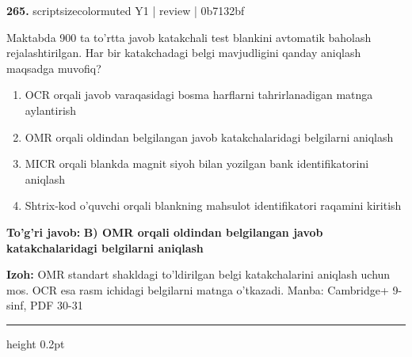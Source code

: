 \documentclass[10pt,a4paper]{article}
\begin{document}
{\bfseries\sffamily\color{ink} 265.} {scriptsizecolor{muted} Y1 | review | 0b7132bf}
\par
Maktabda 900 ta to'rtta javob katakchali test blankini avtomatik baholash rejalashtirilgan. Har bir katakchadagi belgi mavjudligini qanday aniqlash maqsadga muvofiq?
\begin{enumerate}[label=\Alph*),leftmargin=9mm]
\item OCR orqali javob varaqasidagi bosma harflarni tahrirlanadigan matnga aylantirish
\item OMR orqali oldindan belgilangan javob katakchalaridagi belgilarni aniqlash
\item MICR orqali blankda magnit siyoh bilan yozilgan bank identifikatorini aniqlash
\item Shtrix-kod o'quvchi orqali blankning mahsulot identifikatori raqamini kiritish
\end{enumerate}
\begin{tcolorbox}[enhanced,breakable,colback=teal!4,colframe=teal!60!black,boxrule=0.45pt,arc=1.2mm,left=2.7mm,right=2.7mm,top=1.8mm,bottom=1.8mm,before skip=2mm,after skip=2mm]
{\bfseries\sffamily\color{teal}To'g'ri javob:} \textbf{B) OMR orqali oldindan belgilangan javob katakchalaridagi belgilarni aniqlash}
\par\smallskip
{\bfseries Izoh:} OMR standart shakldagi to'ldirilgan belgi katakchalarini aniqlash uchun mos. OCR esa rasm ichidagi belgilarni matnga o'tkazadi. Manba: Cambridge+ 9-sinf, PDF 30-31
\end{tcolorbox}
\vspace{2mm}\hrule height 0.2pt\vspace{3mm}
\end{document}
